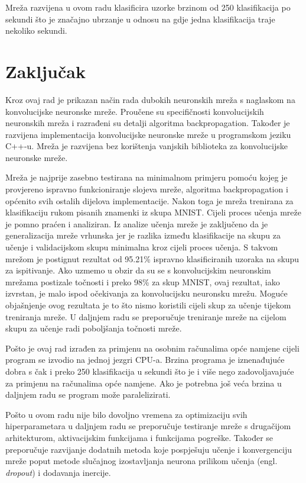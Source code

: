 \documentclass[times, utf8, zavrsni, numeric]{fer}
\begin{document}
Mreža razvijena u ovom radu klasificira uzorke brzinom od 250 klasifikacija po sekundi što je značajno ubrzanje u odnosu na \citep{vukoticraspoznavanje} gdje jedna klasifikacija traje nekoliko sekundi.

\chapter{Zaključak}
Kroz ovaj rad je prikazan način rada dubokih neuronskih mreža s naglaskom na konvolucijske neuronske mreže. Proučene su specifičnosti konvolucijskih neuronskih mreža i razrađeni su detalji algoritma backpropagation. Također je razvijena implementacija konvolucijske neuronske mreže u programskom jeziku C++-u. Mreža je razvijena bez korištenja vanjskih biblioteka za konvolucijske neuronske mreže. 

Mreža je najprije zasebno testirana na minimalnom primjeru pomoću kojeg je provjereno ispravno funkcioniranje slojeva mreže, algoritma backpropagation i općenito svih ostalih dijelova implementacije. Nakon toga je mreža trenirana za klasifikaciju rukom pisanih znamenki iz skupa MNIST. Cijeli proces učenja mreže je pomno praćen i analiziran. Iz analize učenja mreže je zaključeno da je generalizacija mreže vrhunska jer je razlika između klasifikacije na skupu za učenje i validacijskom skupu minimalna kroz cijeli proces učenja. S takvom mrežom je postignut rezultat od 95.21\% ispravno klasificiranih uzoraka na skupu za ispitivanje. Ako uzmemo u obzir da su se s konvolucijskim neuronskim mrežama postizale točnosti i preko 98\% za skup MNIST, ovaj rezultat, iako izvrstan, je malo ispod očekivanja za konvolucijsku neuronsku mrežu. Moguće objašnjenje ovog rezultata je to što nismo koristili cijeli skup za učenje tijekom treniranja mreže. U daljnjem radu se preporučuje treniranje mreže na cijelom skupu za učenje radi poboljšanja točnosti mreže.

Pošto je ovaj rad izrađen za primjenu na osobnim računalima opće namjene cijeli program se izvodio na jednoj jezgri CPU-a. Brzina programa je iznenađujuće dobra s čak i preko 250 klasifikacija u sekundi što je i više nego zadovoljavajuće za primjenu na računalima opće namjene. Ako je potrebna još veća brzina u daljnjem radu se program može paralelizirati.

Pošto u ovom radu nije bilo dovoljno vremena za optimizaciju svih hiperparametara u daljnjem radu se preporučuje testiranje mreže s drugačijom arhitekturom, aktivacijskim funkcijama i funkcijama pogreške. Također se preporučuje razvijanje dodatnih metoda koje pospješuju učenje i konvergenciju mreže poput metode slučajnog izostavljanja neurona prilikom učenja (engl. \textit{dropout}) i dodavanja inercije.
\end{document}
